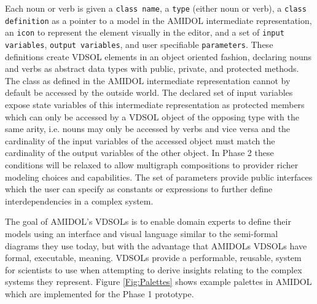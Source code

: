 \documentclass[11pt]{article}
\newcommand{\amidol}{\textsc{AMIDOL}}
\begin{document}
Each noun or verb is given a \texttt{class name}, a \texttt{type} (either noun or verb), a \texttt{class definition} as a pointer to a model in the \amidol{} intermediate representation, an \texttt{icon} to represent the element visually in the editor, and a set of \texttt{input variables}, \texttt{output variables}, and user specifiable \texttt{parameters}.  These definitions create VDSOL elements in an object oriented fashion, declaring nouns and verbs as abstract data types with public, private, and protected methods.  The class as defined in the \amidol{} intermediate representation cannot by default be accessed by the outside world.  The declared set of input variables expose state variables of this intermediate representation as protected members which can only be accessed by a VDSOL object of the opposing type with the same arity, i.e. nouns may only be accessed by verbs and vice versa and the cardinality of the input variables of the accessed object must match the cardinality of the output variables of the other object.  In Phase 2 these conditions will be relaxed to allow multigraph compositions to provider richer modeling choices and capabilities.  The set of parameters provide public interfaces which the user can specify as constants or expressions to further define interdependencies in a complex system.

The goal of \amidol{}'s VDSOLs is to enable domain experts to define their models using an interface and visual language similar to the semi-formal diagrams they use today, but with the advantage that \amidol{}s VDSOLs have formal, executable, meaning.  VDSOLs provide a performable, reusable, system for scientists to use when attempting to derive insights relating to the complex systems they represent.  Figure \ref{Fig:Palettes} shows example palettes in \amidol{} which are implemented for the Phase 1 prototype.
\end{document}
